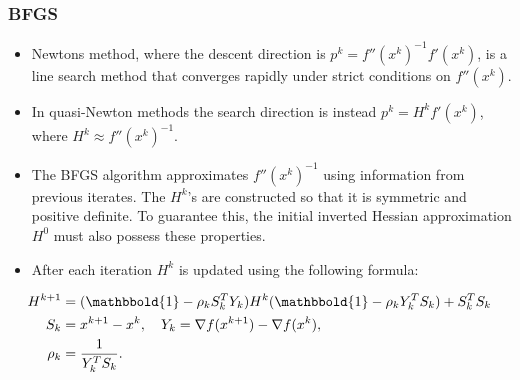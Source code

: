\documentclass[9pt]{beamer}
\begin{document}
\begin{frame}
\frametitle{BFGS}
\begin{itemize}
\item{Newtons method, where the descent direction is $p^k=f''(x^k)^{-1}f'(x^k)$, is a line search method that converges rapidly under strict conditions on $f''(x^k)$. }
\item{In quasi-Newton methods the search direction is instead $p^k=H^kf'(x^k)$, where $H^k\approx f''(x^k)^{-1}$. }
\item{The BFGS algorithm approximates $f''(x^k)^{-1}$ using information from previous iterates. The $H^k$'s are constructed so that it is symmetric and positive definite. To guarantee this, the initial inverted Hessian approximation $H^0$ must also possess these properties.}
\item{After each iteration $H^k$ is updated using the following formula:}
\end{itemize}
{\tiny
\begin{align*}
H^{k+1} &= (\mathbbold{1}-\rho_kS_k^T Y_k)H^k(\mathbbold{1} -\rho_kY_k^T S_k) + S_k^T S_k\\
S_k &= x^{k+1}-x^{k},
\quad Y_k = \nabla f(x^{k+1})-\nabla f(x^{k}),\\
\rho_k &= \frac{1}{Y_k^T S_k}.
\end{align*}
}%
\end{frame}
\end{document}
